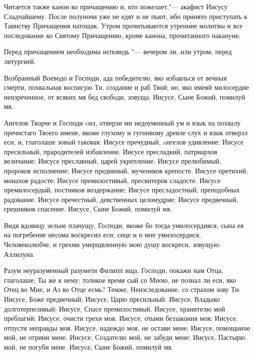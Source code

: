 Читается также канон ко причащению и, кто пожелает,"--- акафист Иисусу Сладчайшему. После полуночи уже не едят и не пьют, ибо принято приступать к Таинству Причащения натощак. Утром прочитываются утренние молитвы и все последование ко Святому Причащению, кроме канона, прочитанного накануне.


Перед причащением необходима исповедь "--- вечером ли, или утром, перед литургией.
\normalfont{}\mychapterending

 



Возбранный  Воеводо и Господи, ада победителю, яко избавлься от вечныя смерти, похвальная восписую Ти, создание и раб Твой; но, яко имеяй милосердие неизреченное, от всяких мя бед свободи, зовуща: Иисусе, Сыне Божий, помилуй мя.





Ангелов
Творче и Господи cил, отверзи ми недоуменный ум и язык на похвалу пречистаго Твоего имене, якоже глухому и гугнивому древле слух и язык отверзл еси, и, глаголаше зовый таковая: Иисусе пречудный, aнгелов удивление; Иисусе пресильный, прародителей избавление. Иисусе пресладкий, патриархов величание; Иисусе преславный, царей укрепление. Иисусе прелюбимый, пророков исполнение; Иисусе предивный, мучеников крепосте. Иисусе претихий, монахов радосте; Иисусе премилостивый,
пресвитеров сладосте. Иисусе премилосердый, постников воздержание; Иисусе пресладостный, преподобных радование. Иисусе пречестный, девственных целомудрие; Иисусе предвечный, грешников спасение. Иисусе, Сыне Божий, помилуй мя.




Видя
вдовицу зельне плачущу, Господи, якоже бо тогда умилосердився, сына ея на погребение несома воскресил еси; сице и о мне умилосердися, Человеколюбче, и грехми умерщвленную мою душу воскреси, зовущую: Аллилуиа.




Разум
неуразуменный разумети Филипп ища, Господи, покажи нам Отца, глаголаше; Ты же к нему: толикое время сый со Мною, не познал ли еси, яко Отец во Мне, и Аз во Отце есмь? Темже, Неизследованне, со страхом зову Ти: Иисусе, Боже предвечный; Иисусе, Царю пресильный. Иисусе, Владыко долготерпеливый; Иисусе, Спасе премилостивый. Иисусе, хранителю мой преблагий; Иисусе, очисти грехи моя. Иисусе, отыми беззакония моя; Иисусе, отпусти неправды моя. Иисусе, надеждо моя, не остави мене; Иисусе, помощниче мой, не отрини мене. Иисусе, Создателю мой, не забуди
мене; Иисусе, Пастырю мой, не погуби мене. Иисусе, Сыне Божий, помилуй мя.


